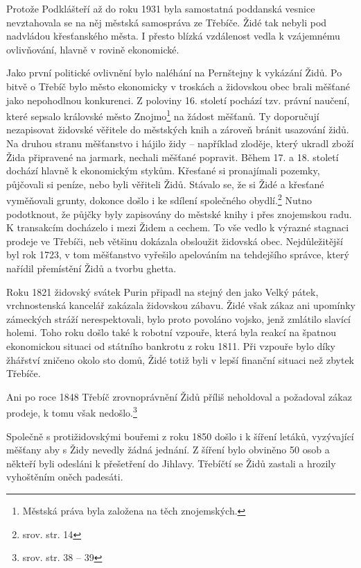 \documentclass[a4paper,oneside,12pt]{report}
\begin{document}
Protože Podklášteří až do roku 1931 byla samostatná poddanská vesnice nevztahovala se na něj městská samospráva ze Třebíče.
Židé tak nebyli pod nadvládou křesťanského města.
I přesto blízká vzdálenost vedla k vzájemnému ovlivňování, hlavně v rovině ekonomické.

Jako první politické ovlivnění bylo naléhání na Pernštejny k vykázání Židů.
Po bitvě o Třebíč bylo město ekonomicky v troskách a židovskou obec brali měšťané jako nepohodlnou konkurenci.
Z poloviny 16. století pochází tzv. právní naučení, které sepsalo královské město Znojmo\footnote{Městská práva byla založena na těch znojemských.} na žádost měšťanů.
Ty doporučují nezapisovat židovské věřitele do městských knih a zároveň bránit usazování židů.
Na druhou stranu měšťanstvo i hájilo židy -- například zloděje, který ukradl zboží Žida připravené na jarmark, nechali měšťané popravit.
Během 17. a 18. století dochází hlavně k ekonomickým stykům.
Křesťané si pronajímali pozemky, půjčovali si peníze, nebo byli věřiteli Židů.
Stávalo se, že si Židé a křesťané vyměňovali grunty, dokonce došlo i ke sdílení společného obydlí.\footnote{srov. \cite{Kracmova2011} str. 14}
Nutno podotknout, že půjčky byly zapisovány do městské knihy i přes znojemskou radu.
K transakcím docházelo i mezi Židem a cechem.
To vše vedlo k výrazné stagnaci prodeje ve Třebíči, neb většinu dokázala obsloužit židovská obec.
Nejdůležitější byl rok 1723, v tom  měšťanstvo vyřešilo  apelováním na tehdejšího správce, který nařídil přemístění Židů a tvorbu ghetta.

Roku 1821 židovský svátek Purin připadl na stejný den jako Velký pátek, vrchnostenská kancelář zakázala židovskou zábavu.
Židé však zákaz ani upomínky zámeckých stráží nerespektovali, bylo proto povoláno vojsko, jenž zmlátilo slavící holemi.
Toho roku došlo také k robotní vzpouře, která byla reakcí na špatnou ekonomickou situaci od státního bankrotu z roku 1811.
Při vzpouře bylo díky žhářství zničeno okolo sto domů, Židé totiž byli v lepší finanční situaci než zbytek Třebíče.

Ani po roce 1848 Třebíč zrovnoprávnění Židů příliš neholdoval a požadoval zákaz prodeje, k tomu však nedošlo.\footnote{srov. \cite{Fiser2005} str. 38 -- 39}

Společně s protižidovskými bouřemi z roku 1850 došlo i k šíření letáků, vyzývající měšťany aby s Židy nevedly žádná jednání.
Z šíření bylo obviněno 50 osob a někteří byli odesláni k přešetření do Jihlavy.
Třebíčtí se Židů zastali a hrozily vyhoštěním oněch padesáti.
\end{document}
